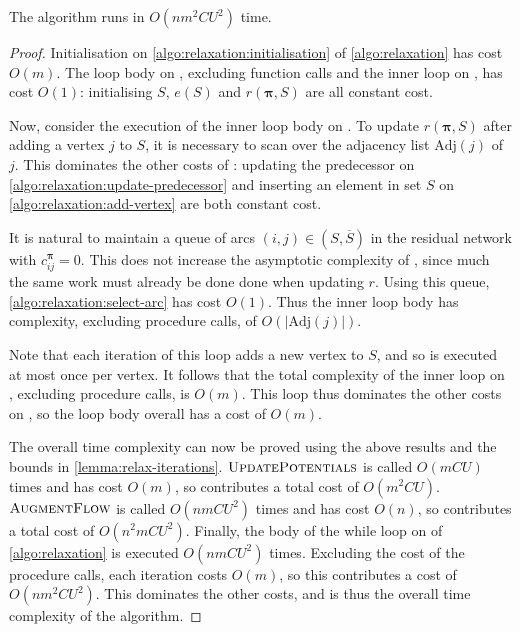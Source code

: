 \begin{thm} \label{thm:relax-complexity}
    The algorithm runs in $O(nm^2CU^2)$ time.
\end{thm}
\begin{proof}
Initialisation on \cref{algo:relaxation:initialisation} of \cref{algo:relaxation} has cost $O(m)$. The loop body on , excluding function calls and the inner loop on , has cost $O(1)$: initialising $S$, $e(S)$ and $r(\boldsymbol{\pi},S)$ are all constant cost.

Now, consider the execution of the inner loop body on . To update $r(\boldsymbol{\pi},S)$ after adding a vertex $j$ to $S$, it is necessary to scan over the adjacency list $\mathrm{Adj}(j)$ of $j$. This dominates the other costs of : updating the predecessor on \cref{algo:relaxation:update-predecessor} and inserting an element in set $S$ on \cref{algo:relaxation:add-vertex} are both constant cost. 

It is natural to maintain a queue of arcs $(i,j) \in \left(S,\overline{S}\right)$ in the residual network with $c_{ij}^{\boldsymbol{\pi}}=0$. This does not increase the asymptotic complexity of , since much the same work must already be done done when updating $r$. Using this queue, \cref{algo:relaxation:select-arc} has cost $O(1)$. Thus the inner loop body has complexity, excluding procedure calls, of $O\left(\left|\mathrm{Adj}(j)\right|\right)$.

Note that each iteration of this loop adds a new vertex to $S$, and so is executed at most once per vertex. It follows that the total complexity of the inner loop on , excluding procedure calls, is $O(m)$. This loop thus dominates the other costs on , so the loop body overall has a cost of $O(m)$.

The overall time complexity can now be proved using the above results and the bounds in \cref{lemma:relax-iterations}. $\textproc{UpdatePotentials}$ is called $O(mCU)$ times and has cost $O(m)$, so contributes a total cost of $O(m^2CU)$. $\textproc{AugmentFlow}$ is called $O(nmCU^2)$ times and has cost $O(n)$, so contributes a total cost of $O(n^2mCU^2)$. Finally, the body of the while loop on  of \cref{algo:relaxation} is executed $O(nmCU^2)$ times. Excluding the cost of the procedure calls, each iteration costs $O(m)$, so this contributes a cost of $O(nm^2CU^2)$. This dominates the other costs, and is thus the overall time complexity of the algorithm.
\end{proof}

